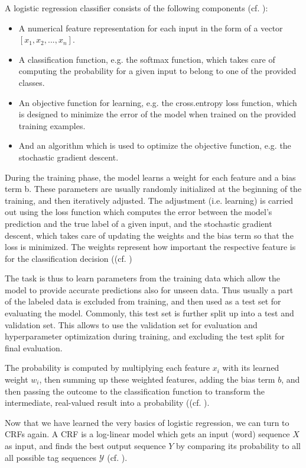 A logistic regression classifier consists of the following components (cf. \cite[2]{jurafsky_2021_5}): 
\begin{itemize}
	\item A numerical feature representation for each input in the form of a vector $[x_1, x_2, ..., x_n]$. 
	\item A classification function, e.g. the softmax function, which takes care of computing the probability for a given input to belong to one of the provided classes. 
	\item An objective function for learning, e.g. the cross.entropy loss function, which is designed to minimize the error of the model when trained on the provided training examples. 
	\item And an algorithm which is used to optimize the objective function, e.g. the stochastic gradient descent. \end{itemize}

During the training phase, the model learns a weight for each feature and a bias term b. These parameters are usually randomly initialized at the beginning of the training, and then iteratively adjusted. The adjustment (i.e. learning) is carried out using the loss function which computes the error between the model's prediction and the true label of a given input, and the stochastic gradient descent, which takes care of updating the weights and the bias term so that the loss is minimized. The weights represent how important the respective feature is for the classification decision ((cf. \cite[3]{jurafsky_2021_5})

The task is thus to learn parameters from the training data which allow the model to provide accurate predictions also for unseen data. Thus usually a part of the labeled data is excluded from training, and then used as a test set for evaluating the model. Commonly, this test set is further split up into a test and validation set. This allows to use the validation set for evaluation and hyperparameter optimization during training, and excluding the test split for final evaluation. 

The probability is computed by multiplying each feature $x_i$ with its learned weight $w_i$, then summing up these weighted features, adding the bias term $b$, and then passing the outcome to the classification function to transform the intermediate, real-valued result into a probability ((cf. \cite[2-3]{jurafsky_2021_5}). 


Now that we have learned the very basics of logistic regression, we can turn to CRFs again. A CRF is a log-linear model which gets an input (word) sequence $X$ as input, and finds the best output sequence $Y$ by comparing its probability to all all possible tag sequences $\mathscr{Y}$ (cf. \cite[16]{jurafsky_2021_8}). 

